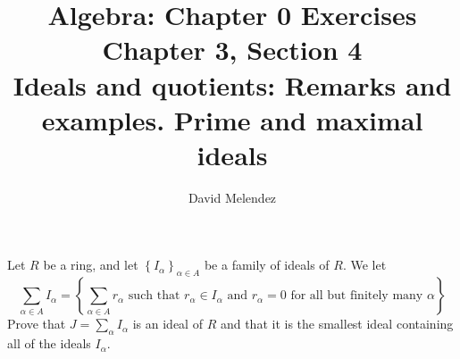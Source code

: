 \documentclass[12pt]{article}
\newenvironment{problem}[2][Problem]{\begin{trivlist}
\item[\hskip \labelsep {\bfseries #1}\hskip \labelsep {\bfseries #2.}]}{\end{trivlist}}
\theoremstyle{remark}
\begin{document}
\title{Algebra: Chapter 0 Exercises\\ \large Chapter 3, Section 4\\ 
\large Ideals and quotients: Remarks and examples. Prime and maximal ideals}
\author{David Melendez}
\maketitle

\begin{problem}{4.1}
  Let $R$ be a ring, and let $\left\{ I_\alpha \right\}_{\alpha\in A}$ be a family of ideals of $R$.
  We let
  \begin{equation*}
    \sum_{\alpha\in A} I_\alpha = \left\{ \sum_{\alpha\in A}r_\alpha
    \text{ such that $r_\alpha\in I_\alpha$ and $r_\alpha=0$ for all but finitely many $\alpha$} 
    \right\}
  \end{equation*}
  Prove that $J=\sum_\alpha I_\alpha$ is an ideal of $R$ and that it is the smallest ideal
  containing all of the ideals $I_\alpha$.
\end{problem}
\end{document}
